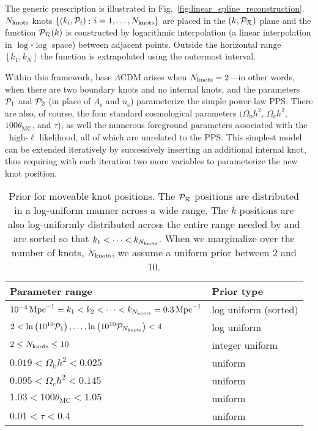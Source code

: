 The generic prescription is illustrated in Fig.~\ref{fig:linear_spline_reconstruction}. $N_\mathrm{knots}$ knots
$\{(k_i,\mathcal{P}_{i})\,$: $i=1,\ldots,N_\mathrm{knots}\}$ are placed in the $(k,\mathcal{P}_\mathcal{R})$ plane and the function $\mathcal{P}_\mathcal{R}(k)$ is
constructed by logarithmic interpolation (a linear interpolation in $\log$-$\log$ space) between adjacent points.
Outside the horizontal range $[k_1,k_N]$ the function is extrapolated using the outermost interval.

Within this framework, base $\Lambda$CDM arises when ${N_\mathrm{knots}=2}$---in other words, when there are two boundary knots
and no internal knots, and the parameters $\mathcal{P}_{1}$ and $\mathcal{P}_{2}$ (in place of $A_\mathrm{s}$ and $n_\mathrm{s}$) parameterize
the simple power-law PPS\@. There are also, of course,
the four standard cosmological parameters $(\Omega_{\mathrm{b}} h^2$, $\Omega_{\mathrm{c}} h^2$, $100\theta_{\mathrm{MC}}$, and 
$\tau$), as well the numerous foreground parameters associated with the \Planck\ high-$\ell$ likelihood, all of which are unrelated to the PPS\@.
This simplest model can be extended iteratively by successively inserting an additional internal knot, thus requiring with each iteration
two more variables to parameterize the new knot position.


\begin{table}
  \begin{tabular}{ll}
    Parameter range &
    Prior type
    \\
    \toprule
    $10^{-4}\,\mathrm{Mpc}^{-1} = k_1< k_2 < \cdots < k_{N_\mathrm{knots}} = 0.3\,\mathrm{Mpc}^{-1}$ &
    log uniform (sorted)
    \\
    $ 2 < \ln\left(10^{10}\mathcal{P}_{1}\right), \ldots ,\ln\left(10^{10}\mathcal{P}_{{N_\mathrm{knots}}}\right) < 4 $  &
    log uniform
    \\
    $2\le N_\mathrm{knots} \le 10 $ &
    integer uniform
    \\
    \midrule
    $0.019< \Omega_\mathrm{b} h^2 <0.025$ &
    uniform
    \\
    $0.095< \Omega_\mathrm{c} h^2 <0.145$ &
    uniform
    \\
    $1.03< 100\theta_\mathrm{MC} <1.05$ &
    uniform
    \\
    $0.01< \tau< 0.4$ &
    uniform
    \\
    \bottomrule
  \end{tabular}
  \caption{%
    Prior for moveable knot positions.
    The $\mathcal{P}_\mathcal{R}$ positions are distributed in a log-uniform manner across a wide range.
    The $k$ positions are also log-uniformly distributed
    across the entire range needed by \CosmoMC{} and are sorted so that ${k_1<\cdots<k_{N_\mathrm{knots}}}$. 
    When we marginalize over the number of knots, $N_\mathrm{knots}$, we assume a uniform prior between 2 and 10.\label{tab:P_k_priors}  }                          %
\end{table}                        %

